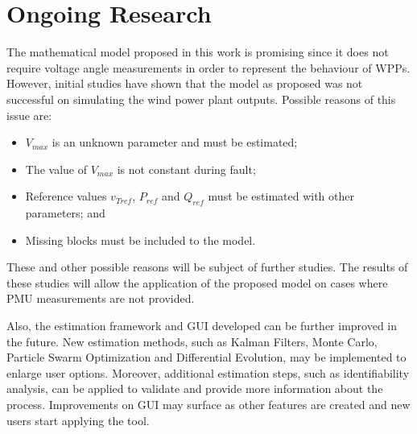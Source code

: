 \chapter{Ongoing Research}
\label{ch: Ongoing}

The mathematical model proposed in this work is promising since it does not require voltage angle measurements in order to represent the behaviour of WPPs. However, initial studies have shown that the model as proposed was not successful on simulating the wind power plant outputs. Possible reasons of this issue are:

\begin{itemize}
	\item $V_{max}$ is an unknown parameter and must be estimated;
	\item The value of $V_{max}$ is not constant during fault;
	\item Reference values $v_{Tref}$, $P_{ref}$ and $Q_{ref}$ must be estimated with other parameters; and
	\item Missing blocks must be included to the model.
\end{itemize}

These and other possible reasons will be subject of further studies. The results of these studies will allow the application of the proposed model on cases where PMU measurements are not provided.

Also, the estimation framework and GUI developed can be further improved in the future. New estimation methods, such as Kalman Filters, Monte Carlo, Particle Swarm Optimization and Differential Evolution, may be implemented to enlarge user options. Moreover, additional estimation steps, such as identifiability analysis, can be applied to validate and provide more information about the process. Improvements on GUI may surface as other features are created and new users start applying the tool.